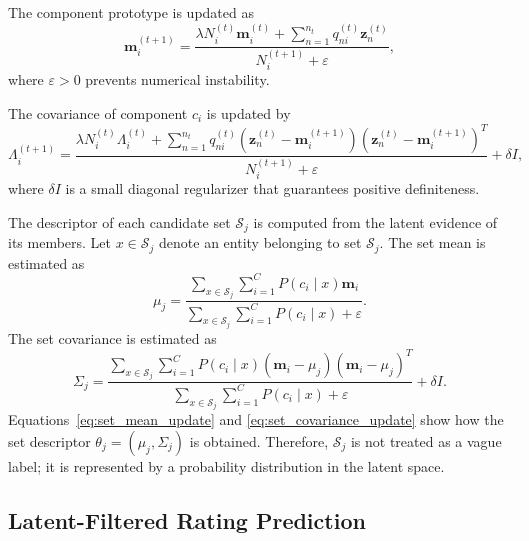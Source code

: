 \documentclass{article}
\theoremstyle{plain}
\theoremstyle{definition}
\theoremstyle{remark}
\begin{document}
The component prototype is updated as
\begin{equation}
	\label{eq:prototype_update}
	\mathbf m_i^{(t+1)}
	=
	\frac{
		\lambda N_i^{(t)}\mathbf m_i^{(t)}
		+
		\sum_{n=1}^{n_t}
		q_{ni}^{(t)}\mathbf z_n^{(t)}
	}{
		N_i^{(t+1)}+\varepsilon
	},
\end{equation}
where \(\varepsilon>0\) prevents numerical instability.

The covariance of component \(c_i\) is updated by
\begin{equation}
	\label{eq:covariance_update}
	\Lambda_i^{(t+1)}
	=
	\frac{
		\lambda N_i^{(t)}\Lambda_i^{(t)}
		+
		\sum_{n=1}^{n_t}
		q_{ni}^{(t)}
		\left(\mathbf z_n^{(t)}-\mathbf m_i^{(t+1)}\right)
		\left(\mathbf z_n^{(t)}-\mathbf m_i^{(t+1)}\right)^T
	}{
		N_i^{(t+1)}+\varepsilon
	}
	+
	\delta I,
\end{equation}
where \(\delta I\) is a small diagonal regularizer that guarantees positive definiteness.

The descriptor of each candidate set \(\mathcal S_j\) is computed from the latent evidence of its members. Let \(x\in\mathcal S_j\) denote an entity belonging to set \(\mathcal S_j\). The set mean is estimated as
\begin{equation}
	\label{eq:set_mean_update}
	\mu_j
	=
	\frac{
		\sum_{x\in\mathcal S_j}
		\sum_{i=1}^{C}
		P(c_i\mid x)\mathbf m_i
	}{
		\sum_{x\in\mathcal S_j}
		\sum_{i=1}^{C}
		P(c_i\mid x)
		+\varepsilon
	}.
\end{equation}
The set covariance is estimated as
\begin{equation}
	\label{eq:set_covariance_update}
	\Sigma_j
	=
	\frac{
		\sum_{x\in\mathcal S_j}
		\sum_{i=1}^{C}
		P(c_i\mid x)
		(\mathbf m_i-\mu_j)(\mathbf m_i-\mu_j)^T
	}{
		\sum_{x\in\mathcal S_j}
		\sum_{i=1}^{C}
		P(c_i\mid x)
		+\varepsilon
	}
	+
	\delta I.
\end{equation}
Equations~\eqref{eq:set_mean_update} and \eqref{eq:set_covariance_update} show how the set descriptor \(\theta_j=(\mu_j,\Sigma_j)\) is obtained. Therefore, \(\mathcal S_j\) is not treated as a vague label; it is represented by a probability distribution in the latent space.

\subsection{Latent-Filtered Rating Prediction}
\label{subsec:rating_prediction}
\end{document}
